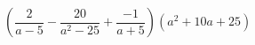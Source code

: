 \begin{ex}[type=expression]
	\begin{condition}
		\(\left( \dfrac{2}{a-5}-\dfrac{20}{a^2-25}+\dfrac{-1}{a+5} \right)(a^2+10a+25)\)
	\end{condition}
\end{ex}